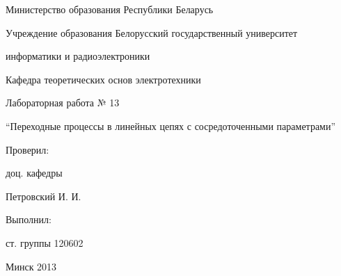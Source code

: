 \thispagestyle{empty}

\begin{center}
Министерство образования Республики Беларусь\par
\vspace{2mm}
Учреждение образования Белорусский государственный университет\par
информатики и радиоэлектроники\par 
\vspace{2mm}
Кафедра теоретических основ электротехники\par

\end{center}

\vspace{70mm}

\begin{center}
Лабораторная работа № 13\par
``Переходные процессы в линейных цепях с сосредоточенными параметрами''\par
\end{center}

\vspace{50mm}

\begin{multicols}{2}
Проверил:

доц. кафедры 

Петровский И. И.
\begin{flushright}
Выполнил:

ст. группы 120602


\end{flushright}
\end{multicols}

\vspace{50mm}
\begin{center}
Минск 2013
\end{center}

\newpage
